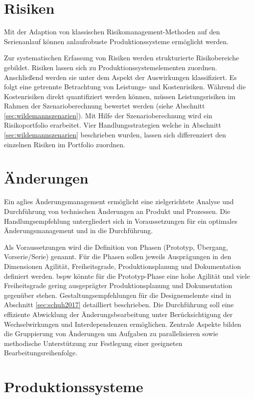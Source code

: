 \section{Risiken}

Mit der Adaption von klassischen Risikomanagement-Methoden auf den Serienanlauf können anlaufrobuste Produktionssysteme ermöglicht werden. 

Zur systematischen Erfassung von Risiken werden strukturierte Risikobereiche gebildet. Risiken lassen sich zu Produktionssystemelementen zuordnen. Anschließend werden sie unter dem Aspekt der Auswirkungen klassifiziert. Es folgt eine getrennte Betrachtung von Leistungs- und Kostenrisiken. 
Während die Kostenrisiken direkt quantifiziert werden können, müssen Leistungsrisiken im Rahmen der Szenarioberechnung bewertet werden (siehe Abschnitt \ref{sec:wildemannszenarien}).
Mit Hilfe der Szenarioberechnung wird ein Risikoportfolio erarbeitet. Vier Handlungsstrategien welche in Abschnitt  \ref{sec:wildemannszenarien} beschrieben wurden, lassen sich differenziert den einzelnen Risiken im Portfolio zuordnen.

\section{Änderungen}

Ein aglies Änderungsmanagement ermöglicht eine zielgerichtete Analyse und Durchführung von technischen Änderungen an Produkt und Prozessen. Die Handlungsempfehlung untergliedert sich in Voraussetzungen für ein optimales Änderungsmanagement und in die Durchführung. %

Als Voraussetzungen wird die Definition von Phasen (Prototyp, Übergang, Vorserie/Serie) genannt. Für die Phasen sollen jeweils Ausprägungen in den Dimensionen Agilität, Freiheitsgrade, Produktionsplanung und Dokumentation definiert werden. \Gls{bspw} könnte für die Prototyp-Phase eine hohe Agilität und viele Freiheitsgrade gering ausgeprägter Produktionsplanung und Dokumentation gegenüber stehen. Gestaltungsempfehlungen für die Designemelemte sind in Abschnitt \ref{sec:schuh2017} detailliert beschrieben. 
Die Durchführung soll eine effiziente Abwicklung der Änderungsbearbeitung unter Berücksichtigung der Wechselwirkungen und Interdependenzen ermöglichen. Zentrale Aspekte bilden die Gruppierung von Änderungen um Aufgaben zu parallelisieren sowie methodische Unterstützung zur Festlegung einer geeigneten Bearbeitungsreihenfolge. 

\section{Produktionssysteme}

